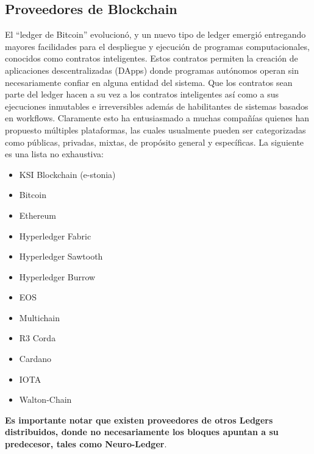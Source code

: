 \subsection{Proveedores de Blockchain}
El ``ledger de Bitcoin'' evolucionó, y un nuevo tipo de ledger emergió entregando mayores facilidades para el despliegue y ejecución de programas computacionales, conocidos como contratos inteligentes. Estos contratos permiten la creación de aplicaciones descentralizadas (DApps) donde programas autónomos operan sin necesariamente confiar en alguna entidad del sistema. Que los contratos sean parte del ledger hacen a su vez a los contratos inteligentes así como a sus ejecuciones inmutables e irreversibles además de habilitantes de sistemas basados en workflows. 
Claramente esto ha entusiasmado a muchas compañías quienes han propuesto múltiples plataformas, las cuales usualmente pueden ser categorizadas como públicas, privadas, mixtas, de propósito general y específicas. La siguiente es una lista no exhaustiva:
\begin{itemize}
    \item KSI Blockchain (e-stonia)
    \item Bitcoin 
    \item Ethereum 
    \item Hyperledger Fabric 
    \item Hyperledger Sawtooth
    \item Hyperledger Burrow 
    \item EOS 
    \item Multichain 
    \item R3 Corda 
    \item Cardano 
    \item IOTA 
    \item Walton-Chain 
  
\end{itemize}
\begin{remark}
\textbf{Es importante notar que existen proveedores de otros Ledgers distribuidos, donde no necesariamente los bloques apuntan a su predecesor, tales como Neuro-Ledger}.
\end{remark}

